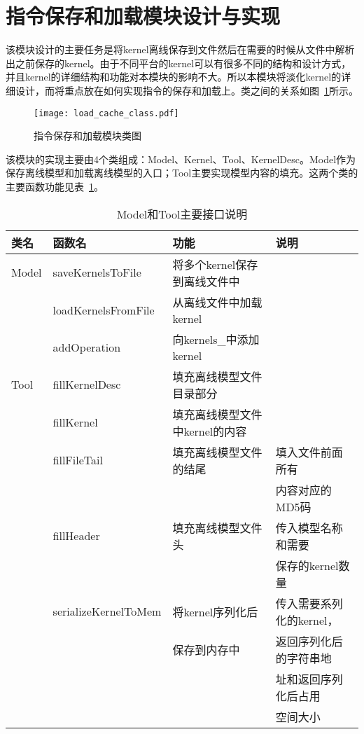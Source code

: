 \section{指令保存和加载模块设计与实现}
该模块设计的主要任务是将kernel离线保存到文件然后在需要的时候从文件中解析出之前保存的kernel。由于不同平台的kernel可以有很多不同的结构和设计方式，并且kernel的详细结构和功能对本模块的影响不大。所以本模块将淡化kernel的详细设计，而将重点放在如何实现指令的保存和加载上。类之间的关系如图~\ref{fig:load-cache-class}所示。

\begin{figure}[htb]
  \centering
  \texttt{[image: load\_cache\_class.pdf]}
  \caption{指令保存和加载模块类图}
  \label{fig:load-cache-class}
\end{figure}


该模块的实现主要由4个类组成：Model、Kernel、Tool、KernelDesc。Model作为保存离线模型和加载离线模型的入口；Tool主要实现模型内容的填充。这两个类的主要函数功能见表~\ref{tab:model-tool-function-list}。

\begin{table}[htb]
  \centering\footnotesize
  \caption{Model和Tool主要接口说明}
  \label{tab:model-tool-function-list}
  \begin{tabular}{llll}
    \toprule
    类名        & 函数名     & 功能      & 说明            \\
    \midrule
    Model      & saveKernelsToFile    & 将多个kernel保存到离线文件中 &  \\
               & loadKernelsFromFile  & 从离线文件中加载kernel &    \\
               & addOperation         &向kernels\_中添加kernel & \\
    \midrule
    Tool       & fillKernelDesc & 填充离线模型文件目录部分 & \\
               & fillKernel   & 填充离线模型文件中kernel的内容 & \\
               & fillFileTail & 填充离线模型文件的结尾  & 填入文件前面所有\\
                                                    &&&内容对应的MD5码 \\
               & fillHeader & 填充离线模型文件头 & 传入模型名称和需要    \\
                                                &&&保存的kernel数量\\
               & serializeKernelToMem & 将kernel序列化后 & 传入需要系列化的kernel，\\
                                      &&保存到内存中     & 返回序列化后的字符串地 \\
                                                       &&&址和返回序列化后占用 \\
                                                       &&&空间大小  \\
               
    \bottomrule
  \end{tabular}
\end{table}


